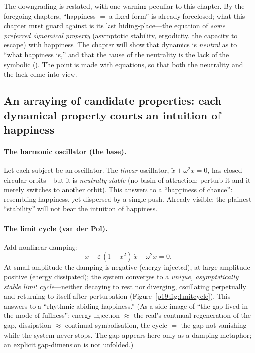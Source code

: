 The downgrading is restated, with one warning peculiar to this chapter. By the foregoing chapters, ``happiness $=$ a fixed form'' is already foreclosed; what this chapter must guard against is its last hiding-place---the equation of \emph{some preferred dynamical property} (asymptotic stability, ergodicity, the capacity to escape) with happiness. The chapter will show that dynamics is \emph{neutral} as to ``what happiness is,'' and that the cause of the neutrality is the lack of the symbolic (). The point is made with equations, so that both the neutrality and the lack come into view.

\subsection{An arraying of candidate properties: each dynamical property courts an intuition of happiness}
\label{p19:sub:dyn-array}

\paragraph{The harmonic oscillator (the base).} Let each subject be an oscillator. The \emph{linear} oscillator, $\ddot{x}+\omega^{2}x=0$, has closed circular orbits---but it is \emph{neutrally stable} (no basin of attraction; perturb it and it merely switches to another orbit). This answers to a ``happiness of chance'': resembling happiness, yet dispersed by a single push. Already visible: the plainest ``stability'' will not bear the intuition of happiness.

\paragraph{The limit cycle (van der Pol).} Add nonlinear damping:
\begin{equation}
\ddot{x}-\varepsilon\,(1-x^{2})\,\dot{x}+\omega^{2}x=0 .
\end{equation}
At small amplitude the damping is negative (energy injected), at large amplitude positive (energy dissipated); the system converges to a \emph{unique, asymptotically stable limit cycle}---neither decaying to rest nor diverging, oscillating perpetually and returning to itself after perturbation (Figure~\ref{p19:fig:limitcycle}). This answers to a ``rhythmic abiding happiness.'' (As a side-image of ``the gap lived in the mode of fullness'': energy-injection $\approx$ the real's continual regeneration of the gap, dissipation $\approx$ continual symbolisation, the cycle $=$ the gap not vanishing while the system never stops. The gap appears here only as a damping metaphor; an explicit gap-dimension is not unfolded.)

